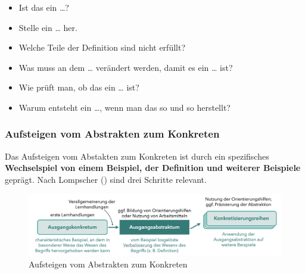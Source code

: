 \documentclass[
]{scrbook}
\providecommand{\tightlist}{%
  \setlength{\itemsep}{0pt}\setlength{\parskip}{0pt}}
\theoremstyle{definition}
\theoremstyle{definition}
\theoremstyle{definition}
\theoremstyle{definition}
\theoremstyle{remark}
\begin{document}
\begin{itemize}
\tightlist
\item
  Ist das ein \ldots?
\item
  Stelle ein \ldots{} her.
\item
  Welche Teile der Definition sind nicht erfüllt?
\item
  Was muss an dem \ldots{} verändert werden, damit es ein \ldots{} ist?
\item
  Wie prüft man, ob das ein \ldots{} ist?
\item
  Warum entsteht ein \ldots, wenn man das so und so herstellt?
\end{itemize}

\subsubsection{Aufsteigen vom Abstrakten zum Konkreten}\label{aufsteigen-vom-abstrakten-zum-konkreten}

Das Aufsteigen vom Abstakten zum Konkreten ist durch ein spezifisches \textbf{Wechselspiel von einem Beispiel, der Definition und weiterer Beispiele} geprägt. Nach Lompscher () sind drei Schritte relevant.

\begin{figure}

{\centering \includegraphics[width=0.9\linewidth]{pictures/7-AK} 

}

\caption{Aufsteigen vom Abstrakten zum Konkreten}\label{fig:AK}
\end{figure}
\end{document}
